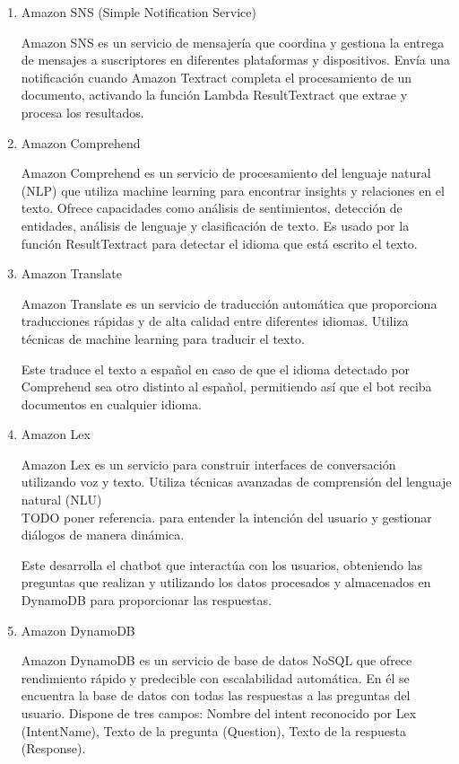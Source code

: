 \begin{enumerate}
    \item Amazon SNS (Simple Notification Service)

    Amazon SNS es un servicio de mensajería que coordina y gestiona la entrega de mensajes a suscriptores en diferentes plataformas y dispositivos.  Envía una notificación cuando Amazon Textract completa el procesamiento de un documento, activando la función Lambda ResultTextract que extrae y procesa los resultados.
    
    \item Amazon Comprehend

    Amazon Comprehend es un servicio de procesamiento del lenguaje natural (NLP) que utiliza machine learning para encontrar insights y relaciones en el texto. Ofrece capacidades como análisis de sentimientos, detección de entidades, análisis de lenguaje y clasificación de texto. Es usado por la función ResultTextract para detectar el idioma que está escrito el texto. 
    \item Amazon Translate

    Amazon Translate es un servicio de traducción automática que proporciona traducciones rápidas y de alta calidad entre diferentes idiomas. Utiliza técnicas de machine learning para traducir el texto.

    Este traduce el texto a español en caso de que el idioma detectado por Comprehend sea otro distinto al español, permitiendo así que el bot reciba documentos en cualquier idioma.
    
    \item Amazon Lex

    Amazon Lex es un servicio para construir interfaces de conversación utilizando voz y texto. Utiliza técnicas avanzadas de comprensión del lenguaje natural (NLU)\\TODO poner referencia. para entender la intención del usuario y gestionar diálogos de manera dinámica.

    Este desarrolla el chatbot que interactúa con los usuarios, obteniendo las preguntas que realizan y utilizando los datos procesados y almacenados en DynamoDB para proporcionar las respuestas. 
    \item Amazon DynamoDB

    Amazon DynamoDB es un servicio de base de datos NoSQL que ofrece rendimiento rápido y predecible con escalabilidad automática. En él se encuentra la base de datos con todas las respuestas a las preguntas del usuario. Dispone de tres campos: Nombre del intent reconocido por Lex (IntentName), Texto de la pregunta (Question), Texto de la respuesta (Response).
\end{enumerate}

